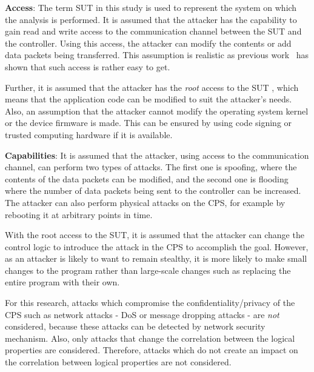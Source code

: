 {\bf Access}: The term \ac{SUT} in this study is used to represent the system on which the analysis is performed. It is assumed that the attacker has the capability to gain read and write access to the communication channel between the \ac{SUT} and the controller. Using this access, the attacker can modify the contents or add data packets being transferred. This assumption is realistic as previous work~\cite{ericsson2010cyber} has shown that such access is rather easy to get.

Further, it is assumed that the attacker has the \textit{root} access to the \ac{SUT} \cite{alemzadeh2016targeted}, which means that the application code can be modified to suit the attacker's needs. Also, an assumption that the attacker cannot modify the operating system kernel or the device firmware is made. This can be ensured by using code signing or trusted computing hardware if it is available. 

{\bf Capabilities}: It is assumed that the attacker, using access to the communication channel, can perform two types of attacks. The first one is spoofing, where the contents of the data packets can be modified, and the second one is flooding where the number of data packets being sent to the controller can be increased. The attacker can also perform physical attacks on the \ac{CPS}, for example by rebooting it at arbitrary points in time. 

With the root access to the \ac{SUT}, it is assumed that the attacker can change the control logic to introduce the attack in the \ac{CPS} to accomplish the goal. However, as an attacker is likely to want to remain stealthy, it is more likely to make small changes to the program rather than large-scale changes such as replacing the entire program with their own. 
 
For this research, attacks which compromise the confidentiality/privacy of the \ac{CPS} such as network attacks - \ac{DoS} or message dropping attacks - are \textit{not} considered, because these attacks can be detected by network security mechanism. Also, only attacks that change the correlation between the logical properties are considered. Therefore, attacks which do not create an impact on the correlation between logical properties are not considered. 

